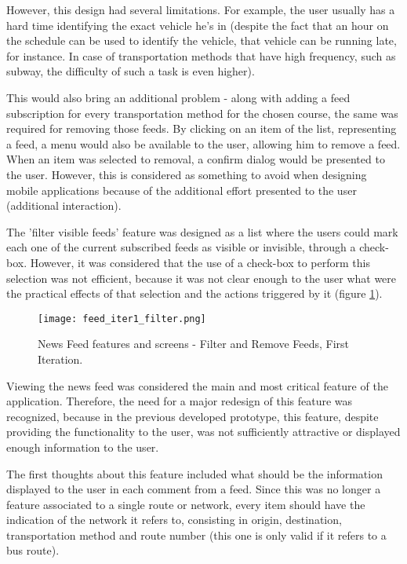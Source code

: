However, this design had several limitations. For example, the user usually has a hard time identifying the exact vehicle he's in (despite the fact that an hour on the schedule can be used to identify the vehicle, that vehicle can be running late, for instance. In case of transportation methods that have high frequency, such as subway, the difficulty of such a task is even higher).


This would also bring an additional problem - along with adding a feed subscription for every transportation method for the chosen course, the same was required for removing those feeds.
By clicking on an item of the list, representing a feed, a menu would also be available to the user, allowing him to remove a feed. When an item was selected to removal, a confirm dialog would be presented to the user. However, this is considered as something to avoid when designing mobile applications because of the additional effort presented to the user (additional interaction).

The 'filter visible feeds' feature was designed as a list where the users could mark each one of the current subscribed feeds as visible or invisible, through a check-box. However, it was considered that the use of a check-box to perform this selection was not efficient, because it was not clear enough to the user what were the practical effects of that selection and the actions triggered by it (figure \ref{fig:feed_iter1_filter}).

\begin{figure}[H]
  \begin{center}
    \leavevmode
    \texttt{[image: feed\_iter1\_filter.png]}
    \caption{News Feed features and screens - Filter and Remove Feeds, First Iteration.}
    \label{fig:feed_iter1_filter}
  \end{center}
\end{figure}


Viewing the news feed was considered the main and most critical feature of the application. Therefore, the need for a major redesign of this feature was recognized, because in the previous developed prototype, this feature, despite providing the functionality to the user, was not sufficiently attractive or displayed enough information to the user.

The first thoughts about this feature included what should be the information displayed to the user in each comment from a feed.
Since this was no longer a feature associated to a single route or network, every item should have the indication of the network it refers to, consisting in origin, destination, transportation method and route number (this one is only valid if it refers to a bus route).

